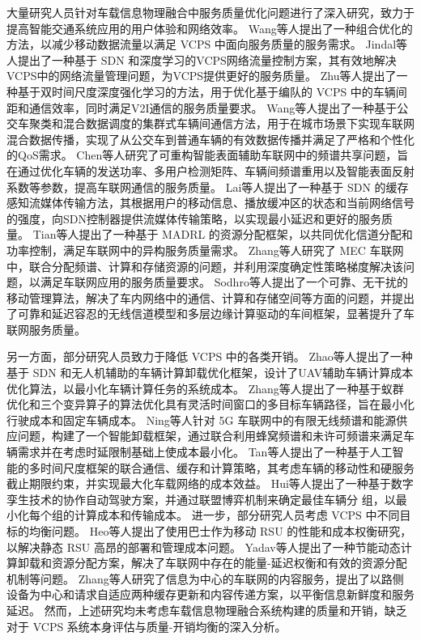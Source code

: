 大量研究人员针对车载信息物理融合中服务质量优化问题进行了深入研究，致力于提高智能交通系统应用的用户体验和网络效率。
Wang等人\cite{wang2016offloading}提出了一种组合优化的方法，以减少移动数据流量以满足 VCPS 中面向服务质量的服务需求。
Jindal等人\cite{jindal2018sedative}提出了一种基于 SDN 和深度学习的VCPS网络流量控制方案，其有效地解决VCPS中的网络流量管理问题，为VCPS提供更好的服务质量。
Zhu等人\cite{zhu2022joint}提出了一种基于双时间尺度深度强化学习的方法，用于优化基于编队的 VCPS 中的车辆间距和通信效率，同时满足V2I通信的服务质量要求。
Wang等人\cite{wang2023a}提出了一种基于公交车聚类和混合数据调度的集群式车辆间通信方法，用于在城市场景下实现车联网混合数据传播，实现了从公交车到普通车辆的有效数据传播并满足了严格和个性化的QoS需求。
Chen等人\cite{chen2021qos}研究了可重构智能表面辅助车联网中的频谱共享问题，旨在通过优化车辆的发送功率、多用户检测矩阵、车辆间频谱重用以及智能表面反射系数等参数，提高车联网通信的服务质量。
Lai等人\cite{lai2017a}提出了一种基于 SDN 的缓存感知流媒体传输方法，其根据用户的移动信息、播放缓冲区的状态和当前网络信号的强度，向SDN控制器提供流媒体传输策略，以实现最小延迟和更好的服务质量。
Tian等人\cite{tian2022multiagent}提出了一种基于 MADRL 的资源分配框架，以共同优化信道分配和功率控制，满足车联网中的异构服务质量需求。
Zhang等人\cite{zhang2020hierarchical}研究了 MEC 车联网中，联合分配频谱、计算和存储资源的问题，并利用深度确定性策略梯度解决该问题，以满足车联网应用的服务质量要求。
Sodhro等人\cite{sodhro2020ai}提出了一个可靠、无干扰的移动管理算法，解决了车内网络中的通信、计算和存储空间等方面的问题，并提出了可靠和延迟容忍的无线信道模型和多层边缘计算驱动的车间框架，显著提升了车联网服务质量。

另一方面，部分研究人员致力于降低 VCPS 中的各类开销。
Zhao等人\cite{zhao2021a}提出了一种基于 SDN 和无人机辅助的车辆计算卸载优化框架，设计了UAV辅助车辆计算成本优化算法，以最小化车辆计算任务的系统成本。
Zhang等人\cite{zhang2019hybrid}提出了一种基于蚁群优化和三个变异算子的算法优化具有灵活时间窗口的多目标车辆路径，旨在最小化行驶成本和固定车辆成本。
Ning等人\cite{ning2020when}针对 5G 车联网中的有限无线频谱和能源供应问题，构建了一个智能卸载框架，通过联合利用蜂窝频谱和未许可频谱来满足车辆需求并在考虑时延限制基础上使成本最小化。
Tan等人\cite{tan2019twin}提出了一种基于人工智能的多时间尺度框架的联合通信、缓存和计算策略，其考虑车辆的移动性和硬服务截止期限约束，并实现最大化车载网络的成本效益。
Hui等人\cite{hui2022collaboration}提出了一种基于数字孪生技术的协作自动驾驶方案，并通过联盟博弈机制来确定最佳车辆分 组，以最小化每个组的计算成本和传输成本。
进一步，部分研究人员考虑 VCPS 中不同目标的均衡问题。
Heo等人\cite{heo2019performance}提出了使用巴士作为移动 RSU 的性能和成本权衡研究，以解决静态 RSU 高昂的部署和管理成本问题。
Yadav等人\cite{yadav2020energy}提出了一种节能动态计算卸载和资源分配方案，解决了车联网中存在的能量-延迟权衡和有效的资源分配机制等问题。
Zhang等人\cite{zhang2022low}研究了信息为中心的车联网的内容服务，提出了以路侧设备为中心和请求自适应两种缓存更新和内容传递方案，以平衡信息新鲜度和服务延迟。
然而，上述研究均未考虑车载信息物理融合系统构建的质量和开销，缺乏对于 VCPS 系统本身评估与质量-开销均衡的深入分析。

